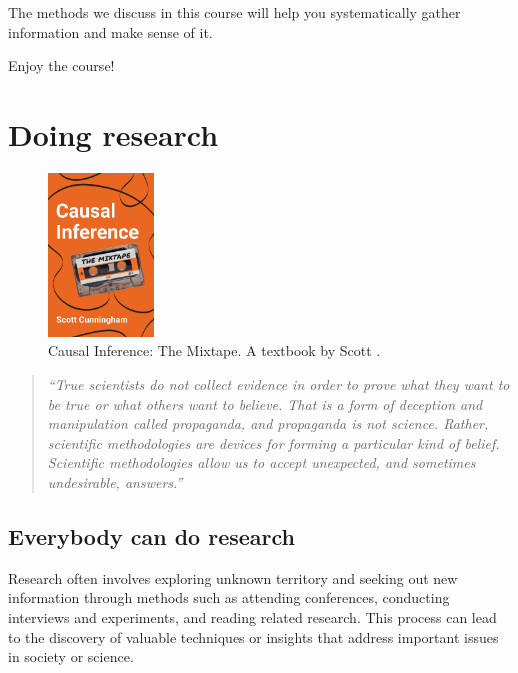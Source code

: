 \documentclass[
  12pt,
  oneside]{book}
\theoremstyle{definition}
\theoremstyle{definition}
\theoremstyle{definition}
\theoremstyle{definition}
\theoremstyle{remark}
\begin{document}
The methods we discuss in this course will help you systematically gather information and make sense of it.

Enjoy the course!

\hypertarget{doing-research}{%
\chapter{Doing research}\label{doing-research}}

\begin{figure}
\centering
\includegraphics[width=0.25\textwidth,height=\textheight]{fig/cover-ci.jpg}
\caption{\label{fig:ci-book} Causal Inference: The Mixtape. A textbook by Scott \citet{Cunningham2021Causal}.}
\end{figure}

\begin{quote}
\emph{``True scientists do not collect evidence in order to prove what they want to be true or what others want to believe. That is a form of deception and manipulation called propaganda, and propaganda is not science. Rather, scientific methodologies are devices for forming a particular kind of belief. Scientific methodologies allow us to accept unexpected, and sometimes undesirable, answers.''} \citep[p.~10]{Cunningham2021Causal}
\end{quote}

\hypertarget{everybody-can-do-research}{%
\section{Everybody can do research}\label{everybody-can-do-research}}

Research often involves exploring unknown territory and seeking out new information through methods such as attending conferences, conducting interviews and experiments, and reading related research. This process can lead to the discovery of valuable techniques or insights that address important issues in society or science.
\end{document}
